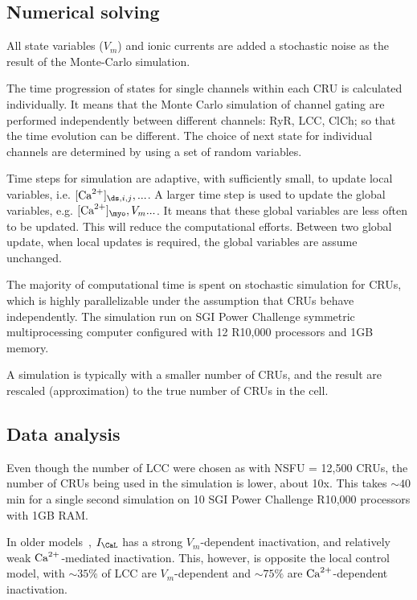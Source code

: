 \subsection{Numerical solving}
\label{sec:numerical-solving-2}

All state variables ($V_m$) and ionic currents are added a stochastic
noise as the result of the Monte-Carlo simulation. 

The time progression of states for single channels within each CRU is calculated
individually. It means that the Monte Carlo simulation of channel gating are
performed independently between different channels: RyR, LCC, ClCh; so that the
time evolution can be different. The choice of next state for individual
channels are determined by using a set of random variables. 

Time steps for simulation are adaptive, with sufficiently small, to update local
variables, i.e. $[\Ca]_{\ds,i,j},...$. A larger time step is used to update the
global variables, e.g. $[\Ca]_\myo, V_m...$. It means that these global
variables are less often to be updated. This will reduce the computational
efforts. Between two global update, when local updates is required,
the global variables are assume unchanged. 

The majority of computational time is spent on stochastic simulation
for CRUs, which is highly parallelizable under the assumption that
CRUs behave independently. The simulation run on SGI Power Challenge symmetric
multiprocessing  computer configured with 12 R10,000 processors and 1GB memory. 

A simulation is typically with a smaller number of CRUs, and the result are
rescaled (approximation) to the true number of CRUs in the cell. 

\subsection{Data analysis}
\label{sec:data-analysis-1}

Even though the number of LCC were chosen as with NSFU = 12,500 CRUs,
the number of CRUs being used in the simulation is lower, about
10x. This takes $\sim 40$ min for a single second simulation on 10
SGI Power Challenge R10,000 processors with 1GB RAM.

In older models~\citep{jafri1998cad, luo1994dmc_b}, $I_\CaL$ has a
strong $V_m$-dependent inactivation, and relatively weak
${\text{Ca}^{2+}}$-mediated inactivation. This, however, is opposite the local
control model, with $\sim 35\%$ of LCC are $V_m$-dependent and $\sim
75\%$ are ${\text{Ca}^{2+}}$-dependent inactivation. 

